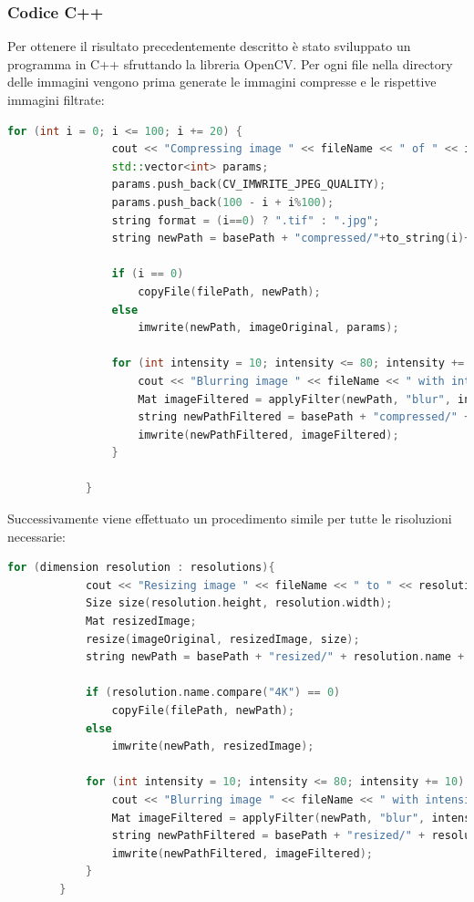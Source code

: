 \documentclass[a4paper,11pt]{article}
\begin{document}
    \subsubsection{Codice C++}
    Per ottenere il risultato precedentemente descritto è stato sviluppato un programma in C++ sfruttando la libreria OpenCV.
    Per ogni file nella directory delle immagini vengono prima generate le immagini compresse e le rispettive immagini filtrate:
    \begin{lstlisting}[language=C++]
        for (int i = 0; i <= 100; i += 20) {
				cout << "Compressing image " << fileName << " of " << i << "%" << endl;
				std::vector<int> params;
				params.push_back(CV_IMWRITE_JPEG_QUALITY);
				params.push_back(100 - i + i%100); 
				string format = (i==0) ? ".tif" : ".jpg";
				string newPath = basePath + "compressed/"+to_string(i)+"/" + fileName + format;

				if (i == 0)
					copyFile(filePath, newPath);
				else
					imwrite(newPath, imageOriginal, params);

				for (int intensity = 10; intensity <= 80; intensity += 10) {
					cout << "Blurring image " << fileName << " with intensity " << intensity << endl;
					Mat imageFiltered = applyFilter(newPath, "blur", intensity);
					string newPathFiltered = basePath + "compressed/" + to_string(i) + "/" + explode(fileName, '_')[0] + "_B" + to_string(intensity/10) + format;
					imwrite(newPathFiltered, imageFiltered);
				}
				
			}
    \end{lstlisting}
    \newpage
    Successivamente viene effettuato un procedimento simile per tutte le risoluzioni necessarie:
    \begin{lstlisting}[language=C++]
        for (dimension resolution : resolutions){
            cout << "Resizing image " << fileName << " to " << resolution.name << endl;
            Size size(resolution.height, resolution.width);
            Mat resizedImage;
            resize(imageOriginal, resizedImage, size);
            string newPath = basePath + "resized/" + resolution.name + "/" + fileName + ".tif";

            if (resolution.name.compare("4K") == 0) 
                copyFile(filePath, newPath);
            else
                imwrite(newPath, resizedImage);

            for (int intensity = 10; intensity <= 80; intensity += 10) {
                cout << "Blurring image " << fileName << " with intensity " << intensity << endl;
                Mat imageFiltered = applyFilter(newPath, "blur", intensity);
                string newPathFiltered = basePath + "resized/" + resolution.name + "/" + explode(fileName, '_')[0] + "_B" + to_string(intensity / 10) + ".tif";
                imwrite(newPathFiltered, imageFiltered);
            }
        }
    \end{lstlisting} 
\end{document}
